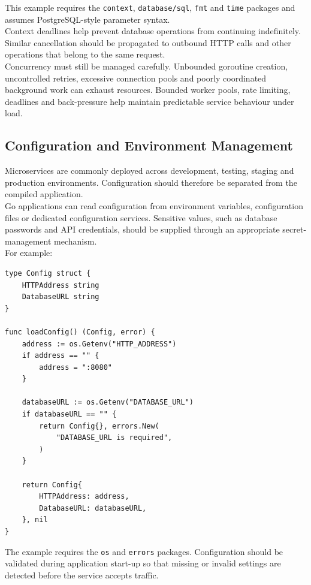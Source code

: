 This example requires the \texttt{context}, \texttt{database/sql}, \texttt{fmt} and \texttt{time} packages and assumes PostgreSQL-style parameter syntax.\\

Context deadlines help prevent database operations from continuing indefinitely. Similar cancellation should be propagated to outbound HTTP calls and other operations that belong to the same request.\\

Concurrency must still be managed carefully. Unbounded goroutine creation, uncontrolled retries, excessive connection pools and poorly coordinated background work can exhaust resources. Bounded worker pools, rate limiting, deadlines and back-pressure help maintain predictable service behaviour under load.

\subsection{Configuration and Environment Management}

Microservices are commonly deployed across development, testing, staging and production environments. Configuration should therefore be separated from the compiled application.\\

Go applications can read configuration from environment variables, configuration files or dedicated configuration services. Sensitive values, such as database passwords and API credentials, should be supplied through an appropriate secret-management mechanism.\\

For example:

\begin{lstlisting}
type Config struct {
    HTTPAddress string
    DatabaseURL string
}

func loadConfig() (Config, error) {
    address := os.Getenv("HTTP_ADDRESS")
    if address == "" {
        address = ":8080"
    }

    databaseURL := os.Getenv("DATABASE_URL")
    if databaseURL == "" {
        return Config{}, errors.New(
            "DATABASE_URL is required",
        )
    }

    return Config{
        HTTPAddress: address,
        DatabaseURL: databaseURL,
    }, nil
}
\end{lstlisting}

The example requires the \texttt{os} and \texttt{errors} packages. Configuration should be validated during application start-up so that missing or invalid settings are detected before the service accepts traffic.\\

